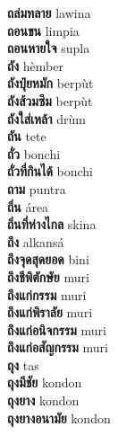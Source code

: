 \textbf{ ถล่มทลาย  } lawina \\
\textbf{ ถอนขน  } limpia \\
\textbf{ ถอนหายใจ  } supla \\
\textbf{ ถัง  } hèmber \\
\textbf{ ถังปุ๋ยหมัก  } berpùt \\
\textbf{ ถังส้วมซึม  } berpùt \\
\textbf{ ถังใส่เหล้า  } drùm \\
\textbf{ ถัน  } tete \\
\textbf{ ถั่ว  } bonchi \\
\textbf{ ถั่วที่กินได้  } bonchi \\
\textbf{ ถาม  } puntra \\
\textbf{ ถิ่น  } área \\
\textbf{ ถิ่นที่ห่างไกล  } skina \\
\textbf{ ถึง  } alkansá \\
\textbf{ ถึงจุดสุดยอด  } bini \\
\textbf{ ถึงชีพิตักษัย  } muri \\
\textbf{ ถึงแก่กรรม  } muri \\
\textbf{ ถึงแก่พิราลัย  } muri \\
\textbf{ ถึงแก่อนิจกรรม  } muri \\
\textbf{ ถึงแก่อสัญกรรม  } muri \\
\textbf{ ถุง  } tas \\
\textbf{ ถุงมีชัย  } kondon \\
\textbf{ ถุงยาง  } kondon \\
\textbf{ ถุงยางอนามัย  } kondon \\
